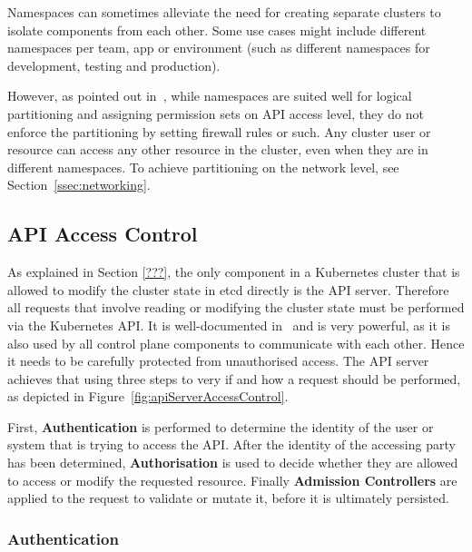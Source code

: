 Namespaces can sometimes alleviate the need for creating separate clusters to isolate components from each other. Some use cases might include different namespaces per team, app or environment (such as different namespaces for development, testing and production). 

However, as pointed out in~\textcite{namespacesInsights}, while namespaces are suited well for logical partitioning and assigning permission sets on API access level, they do not enforce the partitioning by setting firewall rules or such. Any cluster user or resource can access any other resource in the cluster, even when they are in different namespaces. To achieve partitioning on the network level, see Section~\ref{ssec:networking}.

\subsection{API Access Control} \label{sec:apiAccessControl}

As explained in Section \ref{???}, the only component in a Kubernetes cluster that is allowed to modify the cluster state in etcd directly is the API server. Therefore all requests that involve reading or modifying the cluster state must be performed via the Kubernetes API. It is well-documented in~\textcite{k8sdocsApi} and is very powerful, as it is also used by all control plane components to communicate with each other. Hence it needs to be carefully protected from unauthorised access. The API server achieves that using three steps to very if and how a request should be performed, as depicted in Figure~\ref{fig:apiServerAccessControl}.


First, \textbf{Authentication} is performed to determine the identity of the user or system that is trying to access the API. After the identity of the accessing party has been determined, \textbf{Authorisation} is used to decide whether they are allowed to access or modify the requested resource. Finally \textbf{Admission Controllers} are applied to the request to validate or mutate it, before it is ultimately persisted.

\subsubsection{Authentication} \label{ssec:authentication}

